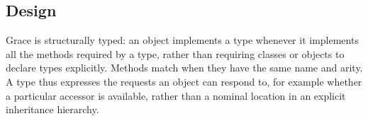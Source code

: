 



\subsection{Design}





%


Grace is structurally typed\citep{graceOnward12}:
an object implements a type whenever it
implements all the methods required by a 
type, rather than requiring classes or objects to declare types explicitly.
Methods match when they have the same name and arity.
A type thus expresses the requests
an object can respond to, for example whether a particular accessor is
available,  rather than a nominal location in an explicit inheritance
hierarchy.


